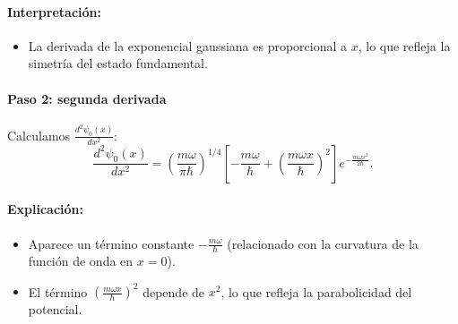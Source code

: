 \documentclass[12pt, a4paper]{article}
\theoremstyle{rioplatense}
\begin{document}
\paragraph{Interpretación:}
\begin{itemize}
    \item La derivada de la exponencial gaussiana es proporcional a \(x\), lo que refleja la simetría del estado fundamental.
\end{itemize}

\paragraph{Paso 2: segunda derivada}
Calculamos \(\frac{d^2\psi_0(x)}{dx^2}\):
\begin{equation*}
    \frac{d^2\psi_0(x)}{dx^2} = \left( \frac{m\omega}{\pi\hbar} \right)^{1/4} \left[ -\frac{m\omega}{\hbar} + \left( \frac{m\omega x}{\hbar} \right)^2 \right] e^{-\frac{m\omega x^2}{2\hbar}}.
\end{equation*}

\paragraph{Explicación:}
\begin{itemize}
    \item Aparece un término constante \(-\frac{m\omega}{\hbar}\) (relacionado con la curvatura de la función de onda en \(x=0\)).
    \item El término \(\left( \frac{m\omega x}{\hbar} \right)^2\) depende de \(x^2\), lo que refleja la parabolicidad del potencial.
\end{itemize}
\end{document}
